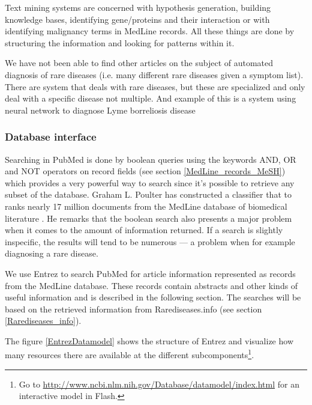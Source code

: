 Text mining systems are concerned with hypothesis generation, building
knowledge bases, identifying gene/proteins and their interaction or
with identifying malignancy terms in MedLine records. All these things
are done by structuring the information and looking for patterns
within it.

We have not been able to find other articles on the subject of
automated diagnosis of rare diseases (i.e. many different rare
diseases given a symptom list). There are system that deals with rare
diseases, but these are specialized and only deal with a specific
disease not multiple. And example of this is a system using neural
network to diagnose Lyme borreliosis disease \cite{AutomatedNNLyme}

\subsubsection{Database interface}
Searching in PubMed is done by boolean queries using the keywords AND,
OR and NOT operators on record fields (see section
\ref{MedLine_records_MeSH}) which provides a very powerful way to
search since it's possible to retrieve any subset of the
database. Graham L. Poulter has constructed a classifier that to ranks
nearly 17 million documents from the MedLine database of biomedical
literature \cite{RapidClassification}. He remarks that the boolean
search also presents a major problem when it comes to the amount of
information returned. If a search is slightly inspecific, the results
will tend to be numerous --- a problem when for example diagnosing a rare
disease.

We use Entrez to search PubMed for article information
represented as records from the MedLine database. These records
contain abstracts and other kinds of useful information and is
described in the following section. The searches will be based on the
retrieved information from Rarediseases.info
(see section \ref{Rarediseases_info}).  

The figure \ref{EntrezDatamodel} shows the structure of Entrez and
visualize how many resources there are available at the different
subcomponents\footnote{Go to
  \href{http://www.ncbi.nlm.nih.gov/Database/datamodel/index.html}{http://www.ncbi.nlm.nih.gov/Database/datamodel/index.html}
  for an interactive model in Flash.}.

